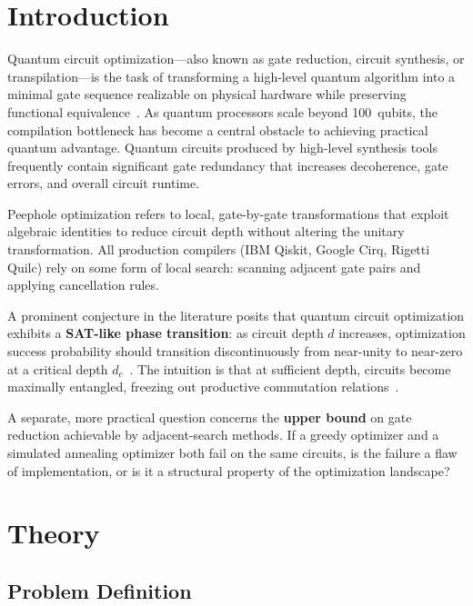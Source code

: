 \documentclass[aps,preprint,secnum,lined]{revtex4-2}
\begin{document}
\section{Introduction}

Quantum circuit optimization---also known as gate reduction, circuit synthesis, or transpilation---is the task of transforming a high-level quantum algorithm into a minimal gate sequence realizable on physical hardware while preserving functional equivalence~\cite{preskill2018nisq}. As quantum processors scale beyond 100~qubits, the compilation bottleneck has become a central obstacle to achieving practical quantum advantage. Quantum circuits produced by high-level synthesis tools frequently contain significant gate redundancy that increases decoherence, gate errors, and overall circuit runtime.

Peephole optimization refers to local, gate-by-gate transformations that exploit algebraic identities to reduce circuit depth without altering the unitary transformation. All production compilers (IBM Qiskit, Google Cirq, Rigetti Quilc) rely on some form of local search: scanning adjacent gate pairs and applying cancellation rules.

A prominent conjecture in the literature posits that quantum circuit optimization exhibits a \textbf{SAT-like phase transition}: as circuit depth $d$ increases, optimization success probability should transition discontinuously from near-unity to near-zero at a critical depth $d_c$~\cite{kirkpatrick1994satisfiability,mezard2002solution}. The intuition is that at sufficient depth, circuits become maximally entangled, freezing out productive commutation relations~\cite{page1993entropy}.

A separate, more practical question concerns the \textbf{upper bound} on gate reduction achievable by adjacent-search methods. If a greedy optimizer and a simulated annealing optimizer both fail on the same circuits, is the failure a flaw of implementation, or is it a structural property of the optimization landscape?


\section{Theory}

\subsection{Problem Definition}
\end{document}
